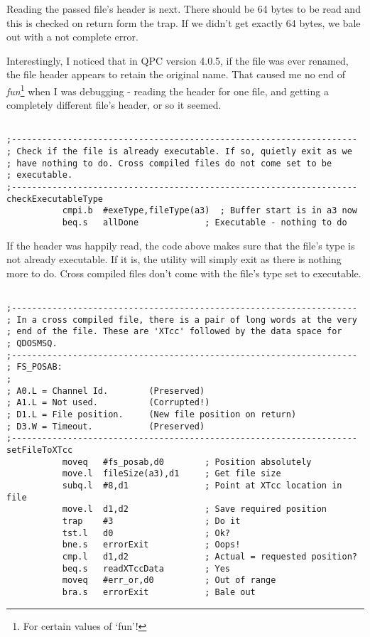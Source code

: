 Reading the passed file's header is next. There should be 64 bytes to be read and this is checked on return form the trap. If we didn't get exactly 64 bytes, we bale out with a not complete error.

Interestingly, I noticed that in QPC version 4.0.5, if the file was ever renamed, the file header appears to retain the original name. That caused me no end of \emph{fun}\footnote{For certain values of `fun'!} when I was debugging - reading the header for one file, and getting a completely different file's header, or so it seemed.


\begin{lstlisting}[firstnumber=last,caption={XTcc - Is the File Executable?}]

;--------------------------------------------------------------------
; Check if the file is already executable. If so, quietly exit as we
; have nothing to do. Cross compiled files do not come set to be
; executable.
;--------------------------------------------------------------------
checkExecutableType
           cmpi.b  #exeType,fileType(a3)  ; Buffer start is in a3 now
           beq.s   allDone             ; Executable - nothing to do
\end{lstlisting}

If the header was happily read, the code above makes sure that the file's type is not already executable. If it is, the utility will simply exit as there is nothing more to do. Cross compiled files don't come with the file's type set to executable.


\begin{lstlisting}[firstnumber=last,caption={XTcc - Locating the XTcc Trailer}]

;--------------------------------------------------------------------
; In a cross compiled file, there is a pair of long words at the very
; end of the file. These are 'XTcc' followed by the data space for
; QDOSMSQ.
;--------------------------------------------------------------------
; FS_POSAB:
;
; A0.L = Channel Id.        (Preserved)
; A1.L = Not used.          (Corrupted!)
; D1.L = File position.     (New file position on return)
; D3.W = Timeout.           (Preserved)
;--------------------------------------------------------------------
setFileToXTcc
           moveq   #fs_posab,d0        ; Position absolutely
           move.l  fileSize(a3),d1     ; Get file size
           subq.l  #8,d1               ; Point at XTcc location in file
           move.l  d1,d2               ; Save required position
           trap    #3                  ; Do it
           tst.l   d0                  ; Ok?
           bne.s   errorExit           ; Oops!
           cmp.l   d1,d2               ; Actual = requested position?
           beq.s   readXTccData        ; Yes
           moveq   #err_or,d0          ; Out of range
           bra.s   errorExit           ; Bale out
\end{lstlisting}

